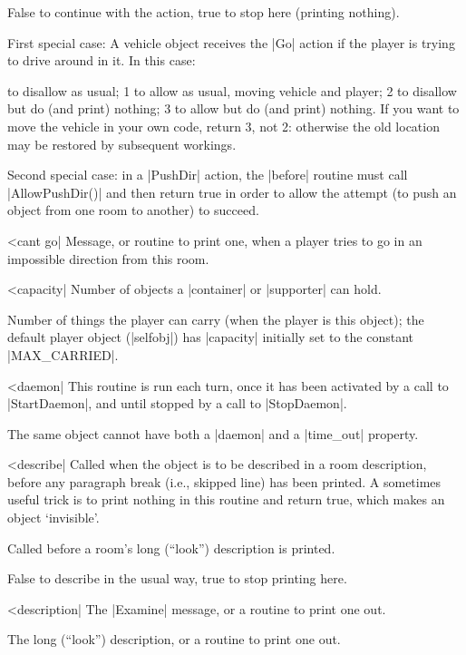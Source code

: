 \rr False to continue with the action, true to stop here (printing
nothing).

\noindent First special case: A vehicle object receives the |Go|
action if the player is trying to drive around in it.  In this case:

 to disallow as usual; 1 to allow as usual, moving vehicle and
player; 2 to disallow but do (and print) nothing; 3 to allow but do
(and print) nothing.  If you want to move the vehicle in your own code,
return 3, not 2: otherwise the old location may be restored by subsequent
workings.

\noindent Second special case: in a |PushDir| action, the |before|
routine must call |AllowPushDir()| and then return true in order to
allow the attempt (to push an object from one room to another) to
succeed.

^^|cant go|
\fr Message, or routine to print one, when a player tries to go in an
impossible direction from this room.

\nrr

^^|capacity|
\fo Number of objects a |container| or |supporter|
can hold.

\fpo Number of things the player can carry (when the player is this
object); the default player object (|selfobj|) has |capacity| initially
set to the constant |MAX_CARRIED|.

^^|daemon|
This routine is run each turn, once it has been activated by a
call to |StartDaemon|, and until stopped by a call to |StopDaemon|.

\warn The same object cannot have both a |daemon| and a |time_out|
property.

^^|describe|
\fo Called when the object is to be described in a room description,
before any paragraph break (i.e., skipped line) has been printed.  A
sometimes useful trick is to print nothing in this routine and return
true, which makes an object `invisible'.

\fr Called before a room's long (``look'') description is printed.

\rr False to describe in the usual way, true to stop printing here.

^^|description|
\fo The |Examine| message, or a routine to print one out.

\fr The long (``look'') description, or a routine to print one out.

